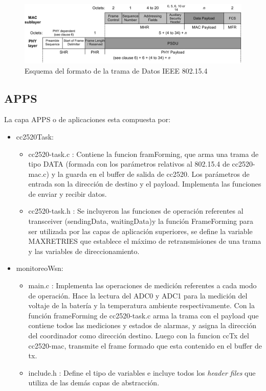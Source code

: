 {\vspace{20px}
\begin{figure}[h!]
	\centering
    \includegraphics[width=1\textwidth]{./Figures/data.jpg}
    	\caption{Esquema del formato de la trama de Datos IEEE 802.15.4 \citep{802154}}
	\label{fig:data}
\end{figure}

\subsection{APPS}
\label{subsec:apps}
La capa APPS	o de aplicaciones esta compuesta por:
\begin{itemize}
\item cc2520Task:
	\begin{itemize}
	\item cc2520-task.c : Contiene la funcion framForming, que arma una trama de tipo DATA (formada con los parámetros relativos al 802.15.4 de cc2520-mac.c) y la guarda en el buffer de salida de cc2520. Los parámetros de entrada son la dirección de destino y el payload. Implementa las funciones de enviar y recibir datos.
	\item cc2520-task.h : Se incluyeron las funciones de operación referentes al transceiver (sendingData, waitingData)y la función FrameForming para ser utilizada por las capas de aplicación superiores, se define la variable MAXRETRIES que establece el máximo de retransmisiones de una trama y las variables de direccionamiento.
	\end{itemize}
\item monitoreoWsn:	
	\begin{itemize}
	\item main.c : Implementa las operaciones de medición referentes a cada modo de operación. Hace la lectura del ADC0 y ADC1 para la medición del voltaje de la batería y la temperatura ambiente respectivamente. Con la función frameForming de cc2520-task.c arma la trama con el payload que contiene todos las mediciones y estados de alarmas, y asigna la dirección del coordinador como dirección destino. Luego con la funcion ccTx del cc2520-mac, transmite el frame formado que esta contenido en el buffer de tx.
	\item include.h : Define el tipo de variables e incluye todos los \textit{header files} que utiliza de las demás capas de abstracción.
	\end{itemize}
\end{itemize}
}
